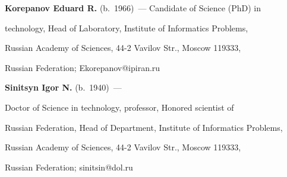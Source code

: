 \noindent

\textbf{Korepanov Eduard R.} (b.\ 1966)~--- Candidate of Science (PhD) in

technology, Head of Laboratory, Institute of Informatics Problems,

Russian Academy of Sciences, 44-2 Vavilov Str., Moscow 119333,

Russian Federation; Ekorepanov@ipiran.ru



\vspace*{3pt}



\noindent

\textbf{Sinitsyn Igor N.} (b.\ 1940)~---

Doctor of Science in technology, professor, Honored scientist of

Russian Federation, Head of Department, Institute of Informatics Problems,

Russian Academy of Sciences, 44-2 Vavilov Str., Moscow 119333,

Russian Federation; sinitsin@dol.ru

\label{end\stat}



\renewcommand{\bibname}{\protect\rm Литература}

